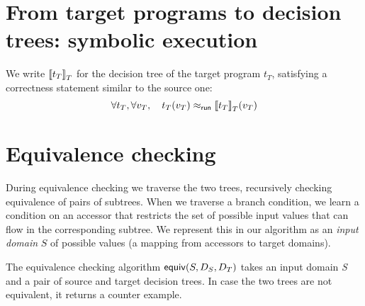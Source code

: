 \documentclass[12pt]{article}
\begin{document}
\section{From target programs to decision trees: symbolic execution}

We write ${\llbracket{t_T}\rrbracket}_T$ for the decision tree of the target program
$t_T$, satisfying a correctness statement similar to the source one:
\[
\forall t_T, \forall v_T, \quad t_T(v_T) \mathrel{\approx_{\mathsf{run}}} {\llbracket{t_T}\rrbracket}_T(v_T)
\]

\section{Equivalence checking}

During equivalence checking we traverse the two trees, recursively checking equivalence of pairs of subtrees.
When we traverse a branch condition, we learn a condition
on an accessor that restricts the set of possible input values that can flow in the corresponding subtree.
We represent this in our algorithm as an \emph{input domain} $S$ of possible values (a mapping from accessors to target domains).

The equivalence checking algorithm $\mathsf{equiv}(S, D_S, D_T)$ takes an input domain \emph{S} and a pair of source and target decision trees. In case the two trees are not equivalent, it returns a counter example.
\end{document}

